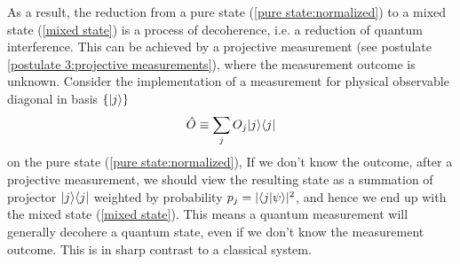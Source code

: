 As a result, the reduction from a pure state (\ref{pure state:normalized}) to a mixed state (\ref{mixed state}) is a process of decoherence, i.e. a reduction of quantum interference. This can be achieved by a projective measurement (see postulate \ref{postulate 3:projective measurements}), where the measurement outcome is unknown. Consider the implementation of a measurement for physical observable diagonal in basis $\{|{j}\rangle\}$
\begin{align}
\hat O\equiv\sum_j O_j|{j}\rangle\langle{j}|
\end{align}
on the pure state (\ref{pure state:normalized}), If we don't know the outcome, after a projective measurement, we should view the resulting state as a summation of projector $|{j}\rangle\langle{j}|$ weighted by probability $p_j=|\langle{j|\psi}\rangle|^2$, and hence we end up with the mixed state (\ref{mixed state}). This means a quantum measurement will generally decohere a quantum state, even if we don't know the measurement outcome. This is in sharp contrast to a classical system. 


